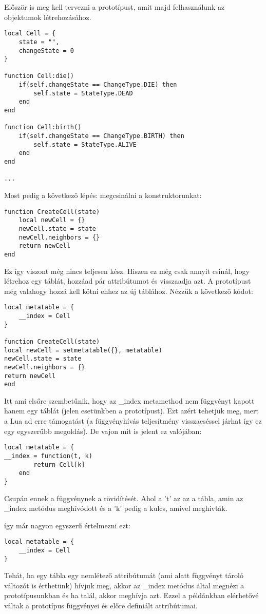 Először is meg kell tervezni a prototípust, amit majd felhasználunk az objektumok létrehozásához.
\scriptsize
\begin{lstlisting}
local Cell = {
	state = "",
	changeState = 0
}

function Cell:die()
	if(self.changeState == ChangeType.DIE) then
		self.state = StateType.DEAD
	end
end

function Cell:birth()
	if(self.changeState == ChangeType.BIRTH) then
		self.state = StateType.ALIVE
	end
end

...
\end{lstlisting}
\normalsize
Most pedig a következő lépés: megcsinálni a konstruktorunkat:
\scriptsize
\begin{lstlisting}
function CreateCell(state)
	local newCell = {}
	newCell.state = state
	newCell.neighbors = {}
	return newCell
end
\end{lstlisting}
\normalsize
Ez így viszont még nincs teljesen kész. Hiszen ez még csak annyit csinál, hogy létrehoz egy táblát, hozzáad pár attribútumot és visszaadja azt. A prototípust még valahogy hozzá kell kötni ehhez az új táblához. Nézzük a következő kódot:
\scriptsize
\begin{lstlisting}
local metatable = {
	__index = Cell
}

function CreateCell(state)
local newCell = setmetatable({}, metatable)
newCell.state = state
newCell.neighbors = {}
return newCell
end
\end{lstlisting}
\normalsize
Itt ami elsőre szembetűnik, hogy az \_index metamethod nem függvényt kapott hanem egy táblát (jelen esetünkben a prototípust). Ezt azért tehetjük meg, mert a Lua ad erre támogatást (a függvényhívás teljesítmény visszaeséssel járhat így ez egy egyszerűbb megoldás). De vajon mit is jelent ez valójában:
\scriptsize
\begin{lstlisting}
local metatable = {
__index = function(t, k)
		return Cell[k]
	end
}
\end{lstlisting}
\normalsize
\newpage
Csupán ennek a függvénynek a rövidítését. Ahol a 't' az az a tábla, amin az \_index metódus meghívódott és a 'k' pedig a kulcs, amivel meghívták.

így már nagyon egyszerű értelmezni ezt:
\scriptsize
\begin{lstlisting}
local metatable = {
	__index = Cell
}
\end{lstlisting}
\normalsize
Tehát, ha egy tábla egy nemlétező attribútumát (ami alatt függvényt tároló változót is érthetünk) hívjuk meg, akkor az \_index metódus által megnézi a prototípusunkban és ha talál, akkor meghívja azt. Ezzel a példánkban elérhetővé váltak a prototípus függvényei és előre definiált attribútumai.

